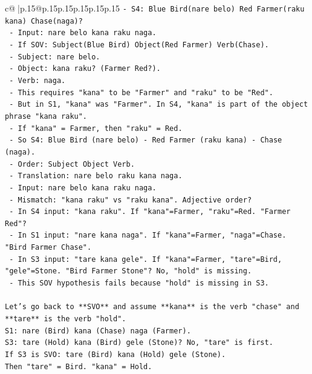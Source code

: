 \documentclass{article}
\begin{document}
{\begin{supertabular}{c@{$\;$}|p{.15\linewidth}@{}p{.15\linewidth}p{.15\linewidth}p{.15\linewidth}p{.15\linewidth}p{.15\linewidth}}
{{{\texttt{{-} S4: Blue Bird(nare belo) Red Farmer(raku kana) Chase(naga)?} \\
\texttt{  {-} Input: nare belo kana raku naga.} \\
\texttt{  {-} If SOV: Subject(Blue Bird) Object(Red Farmer) Verb(Chase).} \\
\texttt{  {-} Subject: nare belo.} \\
\texttt{  {-} Object: kana raku? (Farmer Red?).} \\
\texttt{  {-} Verb: naga.} \\
\texttt{  {-} This requires "kana" to be "Farmer" and "raku" to be "Red".} \\
\texttt{  {-} But in S1, "kana" was "Farmer". In S4, "kana" is part of the object phrase "kana raku".} \\
\texttt{  {-} If "kana" = Farmer, then "raku" = Red.} \\
\texttt{  {-} So S4: Blue Bird (nare belo) {-} Red Farmer (raku kana) {-} Chase (naga).} \\
\texttt{  {-} Order: Subject Object Verb.} \\
\texttt{  {-} Translation: nare belo raku kana naga.} \\
\texttt{  {-} Input: nare belo kana raku naga.} \\
\texttt{  {-} Mismatch: "kana raku" vs "raku kana". Adjective order?} \\
\texttt{  {-} In S4 input: "kana raku". If "kana"=Farmer, "raku"=Red. "Farmer Red"?} \\
\texttt{  {-} In S1 input: "nare kana naga". If "kana"=Farmer, "naga"=Chase. "Bird Farmer Chase".} \\
\texttt{  {-} In S3 input: "tare kana gele". If "kana"=Farmer, "tare"=Bird, "gele"=Stone. "Bird Farmer Stone"? No, "hold" is missing.} \\
\texttt{  {-} This SOV hypothesis fails because "hold" is missing in S3.} \\
\\ 
\texttt{Let's go back to **SVO** and assume **kana** is the verb "chase" and **tare** is the verb "hold".} \\
\texttt{S1: nare (Bird) kana (Chase) naga (Farmer).} \\
\texttt{S3: tare (Hold) kana (Bird) gele (Stone)? No, "tare" is first.} \\
\texttt{If S3 is SVO: tare (Bird) kana (Hold) gele (Stone).} \\
\texttt{Then "tare" = Bird. "kana" = Hold.} \\
}}}
\end{supertabular}}
\end{document}
